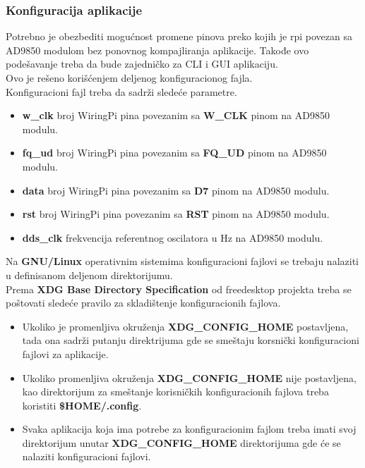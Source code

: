 \subsubsection{Konfiguracija aplikacije} \label{config_file}
Potrebno je obezbediti mogućnost promene pinova preko kojih je \gls{rpi} povezan
sa AD9850 modulom bez ponovnog kompajliranja aplikacije.
Takođe ovo podešavanje treba da bude zajedničko za CLI i GUI aplikaciju.\\
Ovo je rešeno korišćenjem deljenog konfiguracionog fajla. \\

\noindent
Konfiguracioni fajl treba da sadrži sledeće parametre.
\begin{itemize}
\item \textbf{w\_clk} broj WiringPi pina povezanim sa \textbf{W\_CLK} pinom na AD9850 modulu.
\item \textbf{fq\_ud} broj WiringPi pina povezanim sa \textbf{FQ\_UD} pinom na AD9850 modulu.
\item \textbf{data} broj WiringPi pina povezanim sa \textbf{D7} pinom na AD9850 modulu.
\item \textbf{rst} broj WiringPi pina povezanim sa \textbf{RST} pinom na AD9850 modulu.
\item \textbf{dds\_clk} frekvencija referentnog oscilatora u Hz na AD9850 modulu.
\end{itemize}

Na \textbf{GNU/Linux} operativnim sistemima konfiguracioni fajlovi se trebaju
nalaziti u definisanom deljenom direktorijumu. \\
Prema \textbf{XDG Base Directory Specification}\cite{xdg_spec} od freedesktop projekta
treba se poštovati sledeće pravilo za skladištenje konfiguracionih fajlova.

\begin{itemize}
  \item Ukoliko je promenljiva okruženja \textbf{XDG\_CONFIG\_HOME} postavljena,
    tada ona sadrži putanju direktrijuma gde se smeštaju korsnički
    konfiguracioni fajlovi za aplikacije.
  \item Ukoliko promenljiva okruženja \textbf{XDG\_CONFIG\_HOME} nije postavljena, kao
    direktorijum za smeštanje korisničkih konfiguracionih fajlova treba
    koristiti \textbf{\$HOME/.config}.
  \item Svaka aplikacija koja ima potrebe za konfiguracionim fajlom treba imati
    svoj direktorijum unutar \textbf{XDG\_CONFIG\_HOME} direktorijuma gde će se
    nalaziti konfiguracioni fajlovi.
\end{itemize}

